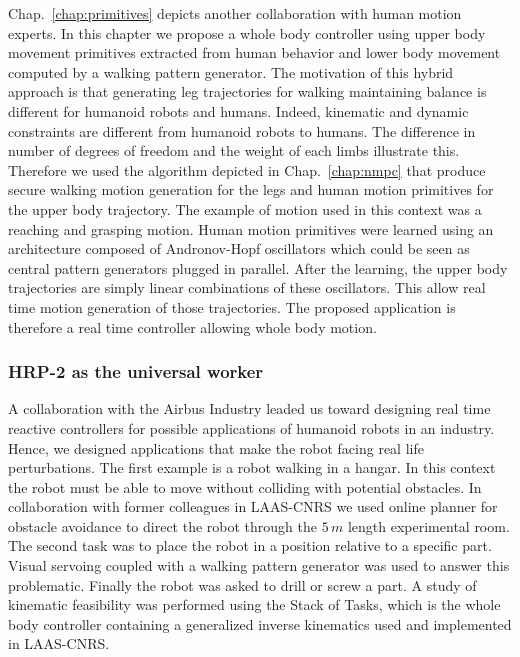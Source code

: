 Chap.~\ref{chap:primitives} depicts another collaboration with human motion experts.
In this chapter we propose a whole body controller using upper body movement primitives extracted from human behavior and lower body movement computed by a walking pattern generator.
The motivation of this hybrid approach is that generating leg trajectories for walking maintaining balance is different for humanoid robots and humans.
Indeed, kinematic and dynamic constraints are different from humanoid robots to humans.
The difference in number of degrees of freedom and the weight of each limbs illustrate this. 
Therefore we used the algorithm depicted in Chap.~\ref{chap:nmpc} that produce secure walking motion generation for the legs and human motion primitives for the upper body trajectory.
The example of motion used in this context was a reaching and grasping motion.
Human motion primitives were learned using an architecture composed of Andronov-Hopf oscillators which could be seen as central pattern generators plugged in parallel.
After the learning, the upper body trajectories are simply linear combinations of these oscillators.
This allow real time motion generation of those trajectories.
The proposed application is therefore a real time controller allowing whole body motion.

\subsubsection*{HRP-2 as the universal worker}

A collaboration with the Airbus Industry leaded us toward designing real time reactive controllers for possible applications of humanoid robots in an industry.
Hence, we designed applications that make the robot facing real life perturbations.
The first example is a robot walking in a hangar.
In this context the robot must be able to move without colliding with potential obstacles.
In collaboration with former colleagues in LAAS-CNRS we used online planner for obstacle avoidance to direct the robot through the $5\,m$ length experimental room.
The second task was to place the robot in a position relative to a specific part.
Visual servoing coupled with a walking pattern generator was used to answer this problematic.
Finally the robot was asked to drill or screw a part.
A study of kinematic feasibility was performed using the Stack of Tasks, which is the whole body controller containing a generalized inverse kinematics used and implemented in LAAS-CNRS.
